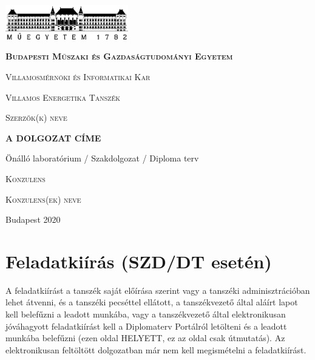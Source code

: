 \documentclass[a4paper, 12pt]{article}
\begin{document}
\begin{titlepage}
	\centering
	\includegraphics[width=0.4\textwidth]{bme_logo.png}\par\vspace{0.5cm}
	{\bfseries\scshape Budapesti Műszaki és Gazdaságtudományi Egyetem \par}
	{\scshape Villamosmérnöki és Informatikai Kar \par}
	{\scshape Villamos Energetika Tanszék \par}
	\vspace{3.5cm}

	{\scshape\large Szerzők(k) neve\par}

	\vspace{0.5cm}

	{\huge\bfseries A DOLGOZAT CÍME\par}

	\vspace{5cm}

	{\Large Önálló laboratórium / Szakdolgozat / Diploma terv\par}

	\vspace{6cm}
	{\scshape Konzulens \par}

	{\scshape\large Konzulens(ek) neve \par}

	\vfill
	{\large Budapest 2020 \par}
\end{titlepage}

\renewcommand{\baselinestretch}{1.3}




\section*{Feladatkiírás (SZD/DT esetén)}
A feladatkiírást a tanszék saját előírása szerint vagy a tanszéki adminisztrációban lehet átvenni, és a tanszéki pecséttel ellátott, a tanszékvezető által aláírt lapot kell belefűzni a leadott munkába, vagy a tanszékvezető által elektronikusan jóváhagyott feladatkiírást kell a Diplomaterv Portálról letölteni és a leadott munkába belefűzni (ezen oldal HELYETT, ez az oldal csak útmutatás). 
Az elektronikusan feltöltött dolgozatban már nem kell megismételni a feladatkiírást.
\end{document}
